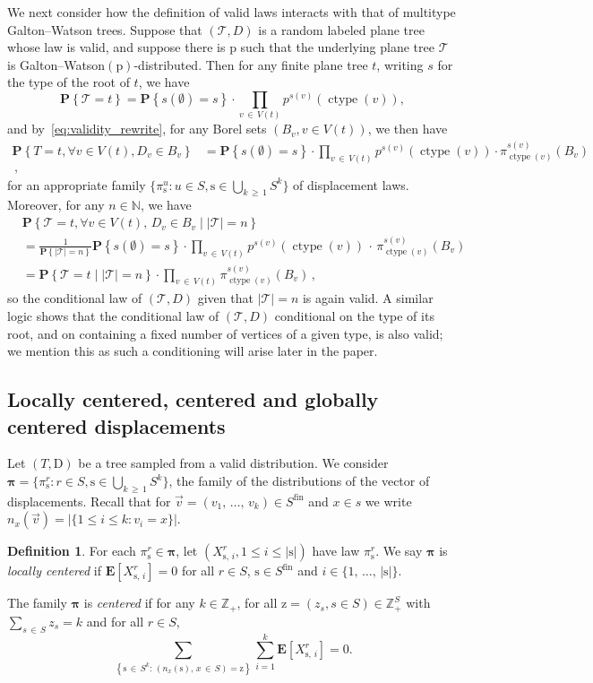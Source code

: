 \documentclass[10pt]{amsart}
\theoremstyle{definition}\newtheorem{defi}[theo]{Definition}\newtheorem{rema}[theo]{Remark}\newtheorem{exam}[theo]{Example}\newtheorem{exem}[theo]{Example}\newtheorem{nota}[theo]{Notation}
\providecommand{\N}{}
\renewcommand{\N}{\mathbb{N}}
\newcommand{\bbZ}{\mathbb{Z}}
\newcommand{\cT}{\mathcal{T}}
\newcommand{\rD}{\mathrm{D}}
\newcommand{\bE}{\mathbf{E}}
\newcommand{\rs}{\mathrm{s}}
\newcommand{\rz}{\mathrm{z}}
\newcommand{\rp}{\mathrm{p}}
\DeclareMathOperator{\cht}{ctype}
\DeclareMathOperator{\fin}{fin}
\newcommand{\E}[1]{\mathbf{E}\left[#1\right]}
\newcommand{\p}[1]{\mathbf{P}\left\{#1\right\}}
\newcommand{\set}[1]{\left\{ #1 \right\}}
\newcommand{\probC}[2]{\mathbf{P}\set{#1 \; \left| \; #2 \right.}}
\let\oldforall\forall
\renewcommand*{\forall}{\mathrel{\oldforall}}
\begin{document}
We next consider how the definition of valid laws interacts with that of multitype Galton--Watson trees. Suppose that $(\cT,D)$ is a random labeled plane tree whose law is valid, and suppose there is $\rp$ such that the underlying plane tree $\cT$ is Galton--Watson$(\rp)$-distributed. Then for any finite plane tree $t$, writing $s$ for the type of the root of $t$, we have
\[
\p{\cT=t} = \p{s(\emptyset)=s}\cdot \prod_{v\,\in\,V(t)} p^{s(v)}(\cht(v)),
\]
and by~\eqref{eq:validity_rewrite}, for any Borel sets $(B_v,v \in V(t))$, we then have
\begin{align*}
\p{T=t, \forall v \in V(t), D_v \in B_v} & = \p{s(\emptyset)=s}\cdot \prod_{v\,\in\,V(t)} p^{s(v)}(\cht(v))\cdot\pi^{s(v)}_{\cht(v)}(B_v)\\
\,,
\end{align*}
for an appropriate family $\{\pi^u_{\rs}: u \in S, \rs \in \bigcup_{k\,\ge\,1} S^k\}$ of displacement laws. Moreover, for any $n \in \N$, we have
\begin{align*}
& \probC{\cT=t, \forall v \in V(t),\,D_v \in B_v}{|\cT|=n} \\
& = \frac{1}{\p{|\cT|=n}}\p{s(\emptyset)=s}\cdot \prod_{v\,\in\,V(t)} p^{s(v)}(\cht(v))\,\cdot\,\pi^{s(v)}_{\cht(v)}(B_v) \\
& = \probC{\cT=t}{|\cT|=n}
\cdot \prod_{v\,\in\,V(t)} \pi^{s(v)}_{\cht(v)}(B_v)\,,
\end{align*}
so the conditional law of $(\cT,D)$ given that $|\cT|=n$ is again valid. A similar logic shows that the conditional law of $(\cT,D)$ conditional on the type of its root, and on containing a fixed number of vertices of a given type, is also valid; we mention this as such a conditioning will arise later in the paper.


\subsection{Locally centered, centered and globally centered displacements}\label{sub:centering}
Let $(T,\rD)$ be a tree sampled from a valid distribution. We consider $\bm{\pi}=\{\pi^r_{\rs}: r \in S, \rs \in \bigcup_{k\,\ge\,1} S^k\}$, the family of the distributions of the vector of displacements. Recall that for $\vec{v} =(v_1,\,\ldots,\,v_k)\in S^{\fin}$ and $x \in s$ we write $n_x(\vec{v})=|\{1 \le i \le k:v_i=x\}|$.

\begin{defi}
For each $\pi^r_{\rs}\in \bm{\pi}$, let $(X^r_{\rs,\,i},1\leq i \leq |\rs|)$ have law $\pi^r_\rs$. We say $\bm{\pi}$ is \emph{locally centered} if $\bE[X^r_{\rs,\,i}]=0$ for all $r\in S$, $\rs \in S^{\fin}$ and $i\in \{1,\,\ldots,\,|\rs|\}$.

The family $\bm{\pi}$ is \emph{centered} if for any $k\in \bbZ_+$, for all $\rz=(z_s,s \in S)\in \bbZ_+^{S}$ with $\sum_{s\,\in\,S} z_s=k$ and for all $r\in S$,
\[
\sum_{\left\{\rs\,\in\,S^k:\,\left(n_x(\rs),\,x\,\in\,S\right)=\rz\right\}} \sum_{i=1}^k\E{X^r_{\rs,\,i}}=0.
\]
\end{defi}
\end{document}
